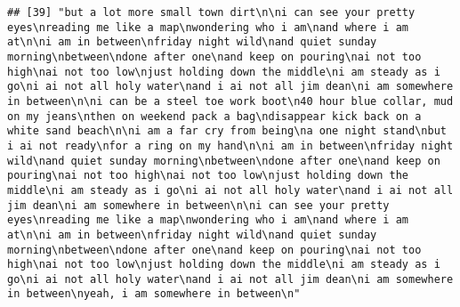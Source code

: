 \documentclass[]{article}
\begin{document}
\begin{verbatim}
## [39] "but a lot more small town dirt\n\ni can see your pretty eyes\nreading me like a map\nwondering who i am\nand where i am at\n\ni am in between\nfriday night wild\nand quiet sunday morning\nbetween\ndone after one\nand keep on pouring\nai not too high\nai not too low\njust holding down the middle\ni am steady as i go\ni ai not all holy water\nand i ai not all jim dean\ni am somewhere in between\n\ni can be a steel toe work boot\n40 hour blue collar, mud on my jeans\nthen on weekend pack a bag\ndisappear kick back on a white sand beach\n\ni am a far cry from being\na one night stand\nbut i ai not ready\nfor a ring on my hand\n\ni am in between\nfriday night wild\nand quiet sunday morning\nbetween\ndone after one\nand keep on pouring\nai not too high\nai not too low\njust holding down the middle\ni am steady as i go\ni ai not all holy water\nand i ai not all jim dean\ni am somewhere in between\n\ni can see your pretty eyes\nreading me like a map\nwondering who i am\nand where i am at\n\ni am in between\nfriday night wild\nand quiet sunday morning\nbetween\ndone after one\nand keep on pouring\nai not too high\nai not too low\njust holding down the middle\ni am steady as i go\ni ai not all holy water\nand i ai not all jim dean\ni am somewhere in between\nyeah, i am somewhere in between\n"                                                                                                                                                                                                                                                                                                                                                                                                                                                                                                                                                                                                                                                                                                                                                                                                                                                                                                                                                                                                                                                                                                                                                                                                                                                                                                                                                                                                                                                                                                                                                                                                                           

\end{verbatim}
\end{document}
